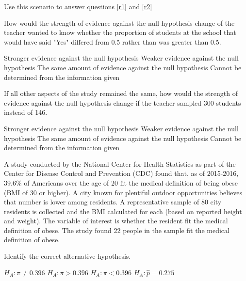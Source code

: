 \documentclass{article}
\begin{document}
\begin{mcquestions}
\begin{mcquestioninstruction}
		Use this scenario to answer questions \ref{r1} and \ref{r2}
	\end{mcquestioninstruction}
	
	\question  How would the strength of evidence against the null hypothesis change of the teacher wanted to know whether the proportion of students at the school that would have said "Yes" differed from 0.5 rather than was greater than 0.5.\label{r1}
	
		\begin{mcanswerslist}
		\answer Stronger evidence against the null hypothesis
		\answer[correct] Weaker evidence against the null hypothesis
		\answer The same amount of evidence against the null hypothesis
		\answer Cannot be determined from the information given
	\end{mcanswerslist}
	
	\question[follow]  If all other aspects of the study remained the same, how would the strength of evidence against the null hypothesis change if the teacher sampled 300 students instead of 146.\label{r2}
	
	\begin{mcanswerslist}
		\answer[correct] Stronger evidence against the null hypothesis
		\answer Weaker evidence against the null hypothesis
		\answer The same amount of evidence against the null hypothesis
		\answer Cannot be determined from the information given
	\end{mcanswerslist}
	
	\question A study conducted by the National Center for Health Statistics as part of the Center for Disease Control and Prevention (CDC) found that, as of 2015-2016, 39.6\% of Americans over the age of 20 fit the medical definition of being obese (BMI of 30 or higher). A city known for plentiful outdoor opportunities believes that number is lower among residents. A representative sample of 80 city residents is collected and the BMI calculated for each (based on reported height and weight). The variable of interest is whether the resident fit the medical definition of obese. The study found 22 people in the sample fit the medical definition of obese.
	
	Identify the correct alternative hypothesis.
	
	\begin{mcanswerslist}
		\answer \(H_A: \pi \neq 0.396\)
		\answer \(H_A: \pi > 0.396\)
		\answer[correct] \(H_A: \pi < 0.396\)
		\answer \(H_A: \hat p = 0.275\)
	\end{mcanswerslist}
		
	\end{mcquestions}
\end{document}
